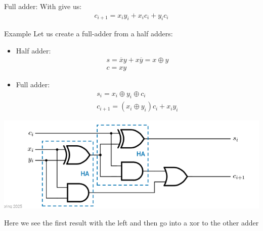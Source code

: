 \begin{parag}{Full adder:}
    With give us:
    \begin{align*}
        c_{i+1} = x_iy_i + x_ic_i + y_ic_i
    \end{align*}
    \begin{subparag}{Example}
        Let us create a full-adder from a half adders:\\
        \begin{itemize}
            \item Half adder:
                \begin{align*}
                    s = \overline{x}y + x \overline{y} = x \oplus y\\
                    c = xy
                \end{align*}
            \item Full adder:
                \begin{align*}
                    s_i = x_i \oplus y_i \oplus c_i\\
                    c_{i+1} = (x_i \oplus y_i)c_i + x_iy_i
                \end{align*}
        \end{itemize}

        \begin{center}
            \includegraphics[scale=0.7]{22025-03-14.png}
        \end{center}
        Here we see the first result with the left  and then go into a xor to the other adder
    \end{subparag}


\end{parag}
